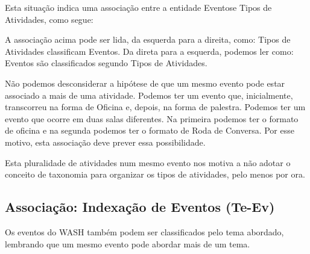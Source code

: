 \documentclass[
12pt,		%
openright,	%
twoside,  %
a4paper,			%
chapter=TITLE,		%
english,			%
french,				%
spanish,			%
brazil				%
]{USPSC-classe/USPSC}
\begin{document}
Esta situa\c{c}\~ao indica uma associa\c{c}\~ao entre a entidade \textquotedbl Eventos\textquotedbl  e \textquotedbl Tipos de Atividades\textquotedbl , como segue:












A associa\c{c}\~ao acima pode ser lida, da esquerda para a direita, como: \textquotedbl Tipos de Atividades classificam Eventos\textquotedbl . Da direta para a esquerda, podemos ler como: \textquotedbl Eventos s\~ao classificados segundo Tipos de Atividades\textquotedbl .










N\~ao podemos desconsiderar a hip\'otese de que um mesmo evento pode estar associado a mais de uma atividade. Podemos ter um evento que, inicialmente, transcorreu na forma de Oficina e, depois, na forma de palestra. Podemos ter um evento que ocorre em duas salas diferentes. Na primeira podemos ter o formato de oficina e na segunda podemos ter o formato de Roda de Conversa. Por esse motivo, esta associa\c{c}\~ao deve prever essa possibilidade.










Esta pluralidade de atividades num mesmo evento nos motiva a n\~ao adotar o conceito de taxonomia para organizar os tipos de atividades, pelo menos por ora.










\subsection[Associa\c{c}\~ao: Indexa\c{c}\~ao de Eventos (Te-Ev)]{Associa\c{c}\~ao: Indexa\c{c}\~ao de Eventos (Te-Ev)}\label{Associa\c{c}\~ao: Indexa\c{c}\~ao de Eventos (Te-Ev)}
Os eventos do WASH tamb\'em podem ser classificados pelo tema abordado, lembrando que um mesmo evento pode abordar mais de um tema.
\end{document}
